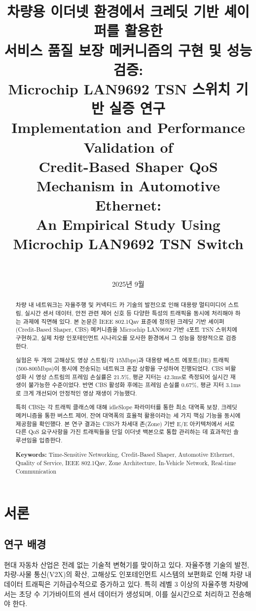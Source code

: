 \documentclass[10pt,twocolumn]{IEEEtran}
\title{차량용 이더넷 환경에서 크레딧 기반 셰이퍼를 활용한\\
서비스 품질 보장 메커니즘의 구현 및 성능 검증:\\
Microchip LAN9692 TSN 스위치 기반 실증 연구\\
\vspace{0.5cm}
\large Implementation and Performance Validation of\\
Credit-Based Shaper QoS Mechanism in Automotive Ethernet:\\
An Empirical Study Using Microchip LAN9692 TSN Switch}
\author{
\IEEEauthorblockN{김현우$^{1}$, 송현수$^{1}$, 안종화$^{1}$, 박부식$^{1}$}\\
\IEEEauthorblockA{$^{1}$TSN팀, 차량전자연구부\\
한국전자기술연구원\\
Email: \{hwkim, shsong, jhahn, bspark\}@keti.re.kr}
}
\date{2025년 9월}
\begin{document}
\maketitle

\begin{abstract}
차량 내 네트워크는 자율주행 및 커넥티드 카 기술의 발전으로 인해 대용량 멀티미디어 스트림, 실시간 센서 데이터, 안전 관련 제어 신호 등 다양한 특성의 트래픽을 동시에 처리해야 하는 과제에 직면해 있다. 본 논문은 IEEE 802.1Qav 표준에 정의된 크레딧 기반 셰이퍼(Credit-Based Shaper, CBS) 메커니즘을 Microchip LAN9692 기반 4포트 TSN 스위치에 구현하고, 실제 차량 인포테인먼트 시나리오를 모사한 환경에서 그 성능을 정량적으로 검증한다. 

실험은 두 개의 고해상도 영상 스트림(각 15Mbps)과 대용량 베스트 에포트(BE) 트래픽(500-800Mbps)이 동시에 전송되는 네트워크 혼잡 상황을 구성하여 진행되었다. CBS 비활성화 시 영상 스트림의 프레임 손실률은 21.5\%, 평균 지터는 42.3ms로 측정되어 실시간 재생이 불가능한 수준이었다. 반면 CBS 활성화 후에는 프레임 손실률 0.67\%, 평균 지터 3.1ms로 크게 개선되어 안정적인 영상 재생이 가능했다. 

특히 CBS는 각 트래픽 클래스에 대해 idleSlope 파라미터를 통한 최소 대역폭 보장, 크레딧 메커니즘을 통한 버스트 제어, 잔여 대역폭의 효율적 활용이라는 세 가지 핵심 기능을 동시에 제공함을 확인했다. 본 연구 결과는 CBS가 차세대 존(Zone) 기반 E/E 아키텍처에서 서로 다른 QoS 요구사항을 가진 트래픽들을 단일 이더넷 백본으로 통합 관리하는 데 효과적인 솔루션임을 입증한다.

\textbf{Keywords:} Time-Sensitive Networking, Credit-Based Shaper, Automotive Ethernet, Quality of Service, IEEE 802.1Qav, Zone Architecture, In-Vehicle Network, Real-time Communication
\end{abstract}

\section{서론}

\subsection{연구 배경}

현대 자동차 산업은 전례 없는 기술적 변혁기를 맞이하고 있다. 자율주행 기술의 발전, 차량-사물 통신(V2X)의 확산, 고해상도 인포테인먼트 시스템의 보편화로 인해 차량 내 데이터 트래픽은 기하급수적으로 증가하고 있다\cite{autonomous2024}. 특히 레벨 3 이상의 자율주행 차량에서는 초당 수 기가바이트의 센서 데이터가 생성되며, 이를 실시간으로 처리하고 전송해야 한다\cite{sensor_fusion2023}.
\end{document}
